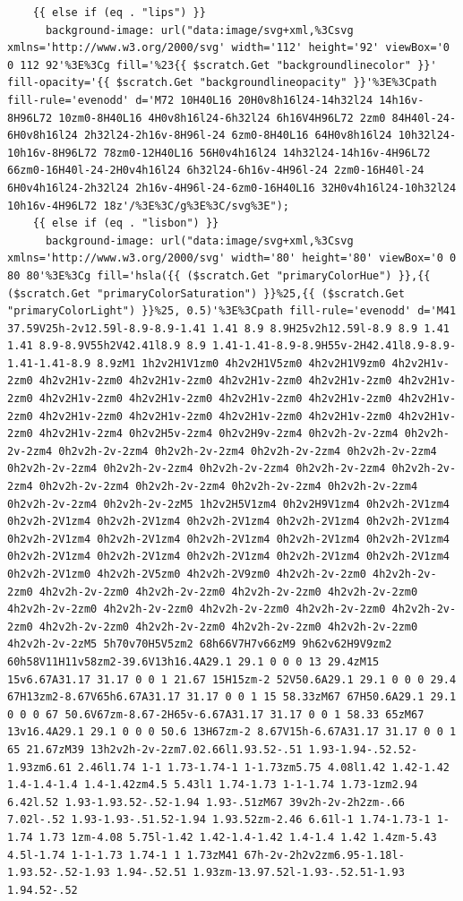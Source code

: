 \documentclass[11pt]{article}
\begin{document}
\begin{enumerate}
\begin{verbatim}
    {{ else if (eq . "lips") }}
      background-image: url("data:image/svg+xml,%3Csvg xmlns='http://www.w3.org/2000/svg' width='112' height='92' viewBox='0 0 112 92'%3E%3Cg fill='%23{{ $scratch.Get "backgroundlinecolor" }}' fill-opacity='{{ $scratch.Get "backgroundlineopacity" }}'%3E%3Cpath fill-rule='evenodd' d='M72 10H40L16 20H0v8h16l24-14h32l24 14h16v-8H96L72 10zm0-8H40L16 4H0v8h16l24-6h32l24 6h16V4H96L72 2zm0 84H40l-24-6H0v8h16l24 2h32l24-2h16v-8H96l-24 6zm0-8H40L16 64H0v8h16l24 10h32l24-10h16v-8H96L72 78zm0-12H40L16 56H0v4h16l24 14h32l24-14h16v-4H96L72 66zm0-16H40l-24-2H0v4h16l24 6h32l24-6h16v-4H96l-24 2zm0-16H40l-24 6H0v4h16l24-2h32l24 2h16v-4H96l-24-6zm0-16H40L16 32H0v4h16l24-10h32l24 10h16v-4H96L72 18z'/%3E%3C/g%3E%3C/svg%3E");
    {{ else if (eq . "lisbon") }}
      background-image: url("data:image/svg+xml,%3Csvg xmlns='http://www.w3.org/2000/svg' width='80' height='80' viewBox='0 0 80 80'%3E%3Cg fill='hsla({{ ($scratch.Get "primaryColorHue") }},{{ ($scratch.Get "primaryColorSaturation") }}%25,{{ ($scratch.Get "primaryColorLight") }}%25, 0.5)'%3E%3Cpath fill-rule='evenodd' d='M41 37.59V25h-2v12.59l-8.9-8.9-1.41 1.41 8.9 8.9H25v2h12.59l-8.9 8.9 1.41 1.41 8.9-8.9V55h2V42.41l8.9 8.9 1.41-1.41-8.9-8.9H55v-2H42.41l8.9-8.9-1.41-1.41-8.9 8.9zM1 1h2v2H1V1zm0 4h2v2H1V5zm0 4h2v2H1V9zm0 4h2v2H1v-2zm0 4h2v2H1v-2zm0 4h2v2H1v-2zm0 4h2v2H1v-2zm0 4h2v2H1v-2zm0 4h2v2H1v-2zm0 4h2v2H1v-2zm0 4h2v2H1v-2zm0 4h2v2H1v-2zm0 4h2v2H1v-2zm0 4h2v2H1v-2zm0 4h2v2H1v-2zm0 4h2v2H1v-2zm0 4h2v2H1v-2zm0 4h2v2H1v-2zm0 4h2v2H1v-2zm0 4h2v2H1v-2zm4 0h2v2H5v-2zm4 0h2v2H9v-2zm4 0h2v2h-2v-2zm4 0h2v2h-2v-2zm4 0h2v2h-2v-2zm4 0h2v2h-2v-2zm4 0h2v2h-2v-2zm4 0h2v2h-2v-2zm4 0h2v2h-2v-2zm4 0h2v2h-2v-2zm4 0h2v2h-2v-2zm4 0h2v2h-2v-2zm4 0h2v2h-2v-2zm4 0h2v2h-2v-2zm4 0h2v2h-2v-2zm4 0h2v2h-2v-2zm4 0h2v2h-2v-2zm4 0h2v2h-2v-2zm4 0h2v2h-2v-2zM5 1h2v2H5V1zm4 0h2v2H9V1zm4 0h2v2h-2V1zm4 0h2v2h-2V1zm4 0h2v2h-2V1zm4 0h2v2h-2V1zm4 0h2v2h-2V1zm4 0h2v2h-2V1zm4 0h2v2h-2V1zm4 0h2v2h-2V1zm4 0h2v2h-2V1zm4 0h2v2h-2V1zm4 0h2v2h-2V1zm4 0h2v2h-2V1zm4 0h2v2h-2V1zm4 0h2v2h-2V1zm4 0h2v2h-2V1zm4 0h2v2h-2V1zm4 0h2v2h-2V1zm0 4h2v2h-2V5zm0 4h2v2h-2V9zm0 4h2v2h-2v-2zm0 4h2v2h-2v-2zm0 4h2v2h-2v-2zm0 4h2v2h-2v-2zm0 4h2v2h-2v-2zm0 4h2v2h-2v-2zm0 4h2v2h-2v-2zm0 4h2v2h-2v-2zm0 4h2v2h-2v-2zm0 4h2v2h-2v-2zm0 4h2v2h-2v-2zm0 4h2v2h-2v-2zm0 4h2v2h-2v-2zm0 4h2v2h-2v-2zm0 4h2v2h-2v-2zm0 4h2v2h-2v-2zM5 5h70v70H5V5zm2 68h66V7H7v66zM9 9h62v62H9V9zm2 60h58V11H11v58zm2-39.6V13h16.4A29.1 29.1 0 0 0 13 29.4zM15 15v6.67A31.17 31.17 0 0 1 21.67 15H15zm-2 52V50.6A29.1 29.1 0 0 0 29.4 67H13zm2-8.67V65h6.67A31.17 31.17 0 0 1 15 58.33zM67 67H50.6A29.1 29.1 0 0 0 67 50.6V67zm-8.67-2H65v-6.67A31.17 31.17 0 0 1 58.33 65zM67 13v16.4A29.1 29.1 0 0 0 50.6 13H67zm-2 8.67V15h-6.67A31.17 31.17 0 0 1 65 21.67zM39 13h2v2h-2v-2zm7.02.66l1.93.52-.51 1.93-1.94-.52.52-1.93zm6.61 2.46l1.74 1-1 1.73-1.74-1 1-1.73zm5.75 4.08l1.42 1.42-1.42 1.4-1.4-1.4 1.4-1.42zm4.5 5.43l1 1.74-1.73 1-1-1.74 1.73-1zm2.94 6.42l.52 1.93-1.93.52-.52-1.94 1.93-.51zM67 39v2h-2v-2h2zm-.66 7.02l-.52 1.93-1.93-.51.52-1.94 1.93.52zm-2.46 6.61l-1 1.74-1.73-1 1-1.74 1.73 1zm-4.08 5.75l-1.42 1.42-1.4-1.42 1.4-1.4 1.42 1.4zm-5.43 4.5l-1.74 1-1-1.73 1.74-1 1 1.73zM41 67h-2v-2h2v2zm6.95-1.18l-1.93.52-.52-1.93 1.94-.52.51 1.93zm-13.97.52l-1.93-.52.51-1.93 1.94.52-.52 
\end{verbatim}
\end{enumerate}
\end{document}

